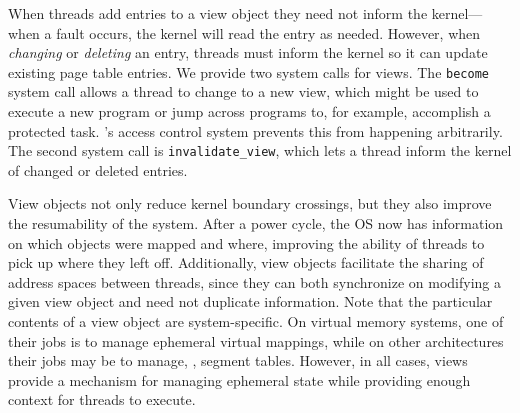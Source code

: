 {    When threads add entries to a view object they need not inform the kernel---when
    a fault occurs, the kernel will read the entry as needed. However, when \emph{changing} or
    \emph{deleting} an entry, threads must inform the kernel so it can update existing page table entries.
    We provide two system calls for views. The \texttt{become} system call allows a thread to
    change to a new view, which might be used to execute a new program or jump across programs to, for
    example, accomplish a protected task. \Twizzler's access control system prevents this from happening
    arbitrarily. The second system call is \texttt{invalidate\_view}, which lets a thread inform the
    kernel of changed or deleted entries.

    View objects not only reduce kernel boundary crossings, but they also improve the resumability of
    the system. After a power cycle, the OS now has information on which objects were mapped and where,
    improving the ability of threads to pick up where they left off. Additionally, view objects
    facilitate the sharing of address spaces between threads, since they can both synchronize on
    modifying a given view object and need not duplicate information. Note that the particular contents
    of a view object are system-specific. On virtual memory systems, one of their jobs is to manage
    ephemeral virtual mappings, while on other architectures their jobs may be to manage, \eg, segment
    tables. However, in all cases, views provide a mechanism for managing ephemeral state while
    providing enough context for threads to execute.
}



